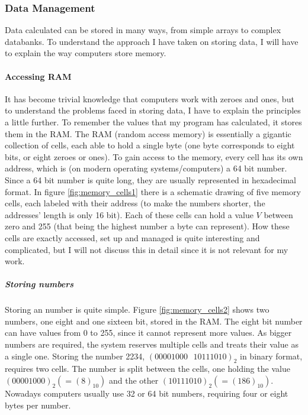 \documentclass[10pt,a4paper,titlepage]{article}
\begin{document}
	\subsubsection{Data Management}\label{sec:data_management}
	Data calculated can be stored in many ways, from simple arrays to complex databanks. To understand the approach I have taken on storing data, I will have to explain the way computers store memory.
	\paragraph{Accessing RAM}
	It has become trivial knowledge that computers work with zeroes and ones, but to understand the problems faced in storing data, I have to explain the principles a little further. To remember the values that my program has calculated, it stores them in the RAM. The RAM (random access memory) is essentially a gigantic collection of cells, each able to hold a single byte (one byte corresponds to eight bits, or eight zeroes or ones). To gain access to the memory, every cell has its own address, which is (on modern operating systems/computers) a 64 bit number. Since a 64 bit number is quite long, they are usually represented in hexadecimal format. In figure \ref{fig:memory_cells1} there is a schematic drawing of five memory cells, each labeled with their address (to make the numbers shorter, the addresses' length is only 16 bit). Each of these cells can hold a value $V$ between zero and 255 (that being the highest number a byte can represent). How these cells are exactly accessed, set up and managed is quite interesting and complicated, but I will not discuss this in detail since it is not relevant for my work.\\
	\subparagraph{Storing numbers}
	Storing an number is quite simple. Figure \ref{fig:memory_cells2} shows two numbers, one eight and one sixteen bit, stored in the RAM. The eight bit number can have values from 0 to 255, since it cannot represent more values. As bigger numbers are required, the system reserves multiple cells and treats their value as a single one. Storing the number 2234, \((00001000\text{ }10111010)_2\) in binary format, requires two cells. The number is split between the cells, one holding the value \((00001000)_2 (= (8)_{10})\) and the other \((10111010)_2(=(186)_{10})\). Nowadays computers usually use 32 or 64 bit numbers, requiring four or eight bytes per number.
	
\end{document}
